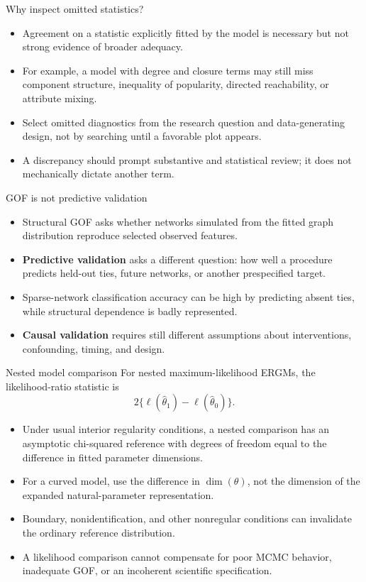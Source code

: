 \documentclass[aspectratio=169,11pt]{beamer}
\newcommand{\term}[1]{\textbf{\color{nupurple}#1}}
\begin{document}
\begin{frame}{Why inspect omitted statistics?}
\begin{itemize}
\item Agreement on a statistic explicitly fitted by the model is necessary but not strong evidence of broader adequacy.
\item For example, a model with degree and closure terms may still miss component structure, inequality of popularity, directed reachability, or attribute mixing.
\item Select omitted diagnostics from the research question and data-generating design, not by searching until a favorable plot appears.
\item A discrepancy should prompt substantive and statistical review; it does not mechanically dictate another term.
\end{itemize}
\end{frame}

\begin{frame}{GOF is not predictive validation}
\begin{itemize}
\item Structural GOF asks whether networks simulated from the fitted graph distribution reproduce selected observed features.
\item \term{Predictive validation} asks a different question: how well a procedure predicts held-out ties, future networks, or another prespecified target.
\item Sparse-network classification accuracy can be high by predicting absent ties, while structural dependence is badly represented.
\item \term{Causal validation} requires still different assumptions about interventions, confounding, timing, and design.
\end{itemize}
\end{frame}

\begin{frame}{Nested model comparison}
For nested maximum-likelihood ERGMs, the likelihood-ratio statistic is
\[
2\{\ell(\hat\theta_1)-\ell(\hat\theta_0)\}.
\]
\begin{itemize}
\item Under usual interior regularity conditions, a nested comparison has an asymptotic chi-squared reference with degrees of freedom equal to the difference in fitted parameter dimensions.
\item For a curved model, use the difference in $\dim(\theta)$, not the dimension of the expanded natural-parameter representation.
\item Boundary, nonidentification, and other nonregular conditions can invalidate the ordinary reference distribution.
\item A likelihood comparison cannot compensate for poor MCMC behavior, inadequate GOF, or an incoherent scientific specification.
\end{itemize}
\end{frame}
\end{document}
